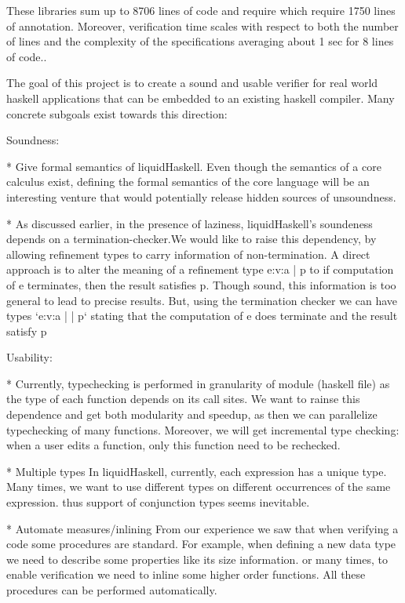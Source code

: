 \documentclass[10pt,a4paper]{article}
\begin{document}
These libraries sum up to 8706 lines of code and require 
which require 1750 lines of annotation.
Moreover, verification time scales
with respect to both the number of lines 
and the complexity of the specifications
averaging about 1 sec for 8 lines of code..


The goal of this project is to create a sound and usable verifier
for real world haskell applications that can be embedded to an
existing haskell compiler.
Many concrete subgoals exist towards this direction:

Soundness:
 
* Give formal semantics of liquidHaskell.
  Even though the semantics of a core calculus exist, 
  defining the formal semantics of the core language 
  will be an interesting venture
  that would potentially release hidden sources of unsoundness.


* As discussed earlier, in the presence of laziness, liquidHaskell's soundeness
  depends on a termination-checker.We would like to raise this dependency, 
  by allowing refinement types to carry information of non-termination.
  A direct approach is to alter the meaning of a refinement type e:{v:a | p}
  to if computation of e terminates, then the result satisfies p.
  Though sound, this information is too general to lead to precise results.
  But, using the termination checker we can have types 
  `e:{v:a | | p}`
  stating that the computation of e does terminate and the result satisfy p

Usability:

* Currently, typechecking is performed in granularity of module (haskell file)
  as the type of each function depends on its call sites.
  We want to rainse this dependence and get both modularity and speedup, as 
  then we can parallelize typechecking of many functions.
  Moreover, we will get incremental type checking: when a user edits a function, 
  only this function need to be rechecked.

* Multiple types 
  In liquidHaskell, currently, each expression has a unique type.
  Many times, we want to use different types on different occurrences of the same expression.
  thus support of conjunction types seems inevitable.

* Automate measures/inlining
  From our experience we saw that when verifying a code some procedures are standard.
  For example, when defining a  new data type we need to describe some properties like its size information.
  or many times, to enable verification we need to inline some higher order functions.
  All these procedures can be performed automatically.
\end{document}
